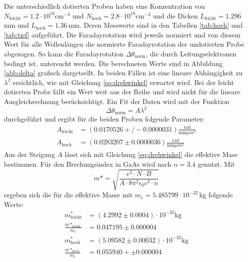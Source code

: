 Die unterschiedlich dotierten Proben haben eine Konzentration von $N_{\text{leicht}}=1.2\cdot10^{18}\text{cm}^{-3}$ und $N_{\text{hoch}}=2.8\cdot10^{18}\text{cm}^{-3}$ und die Dicken $L_{\text{leicht}}=1.296\,$mm und $L_{\text{hoch}}=1.36\,$mm.
Deren Messwerte sind in den Tabellen \ref{tab:hoch} und \ref{tab:tief} aufgeführt.
Die Faradayrotation wird jeweils normiert und von diesem Wert für alle Wellenlängen die normierte Faradayrotation der undotierten Probe abgezogen.
So kann die Faradayrotation $\Delta\theta_\text{norm}$, die durch Leitungselektronen bedingt ist, untersucht werden.
Die berechneten Werte sind in Abbildung \ref{abb:delta} grafisch dargetsellt.
In beiden Fällen ist eine lineare Abhängigkeit zu $\lambda^2$ ersichtlich, wie mit Gleichung \ref{eq:drehwinkel} erwartet wird.
Bei der leicht dotierten Probe fällt ein Wert weit aus der Reihe und wird nicht für die lineare Ausgleichrechnung berücksichtigt.
Ein Fit der Daten wird mit der Funktion
\begin{equation}
  \Delta\theta_{\text{norm}} = A\lambda^2
\end{equation}
durchgeführt und ergibt für die beiden Proben folgende Parameter:
\begin{align*}
  A_{\text{leicht}} &= (0.0170526 +/- 0.0000031) \frac{\text{rad}}{\text{mm}\mu m^2} \\
  A_{\text{hoch}} &= (0.0283207 \pm 0.0000036) \frac{\text{rad}}{\text{mm}\mu m^2}
\end{align*}
Aus der Steigung $A$ lässt sich mit Gleichung \ref{eq:drehwinkel} die effektive Mase bestimmen.
Für den Brechungsindex in GaAs wird nach \cite{nGaAs} $n=3.4$ genutzt.
Mit
\begin{equation}
  m*=\sqrt{\frac{e^3\cdot N \cdot B}{A\cdot 8\pi^2\epsilon_0 c^3 \cdot n }}
\end{equation}
ergeben sich die für die effektive Masse mit $m_e = 5.485799\cdot 10^{-32}\,$kg folgende Werte:
\begin{align*}
  m^*_{\text{leicht}} &= (4.2992 \pm 0.0004)\cdot 10^{-32}\text{kg} \\
  \frac{m*_{\text{leicht}}}{m_e} &= 0.047195\pm 0.000004 \\
  m^*_{\text{hoch}} &= (5.09582\pm 0.00032)\cdot 10^{-32}\text{kg} \\
  \frac{m*_{\text{hoch}}}{m_e} &= 0.055940+\pm 0.000004\\
\end{align*}

